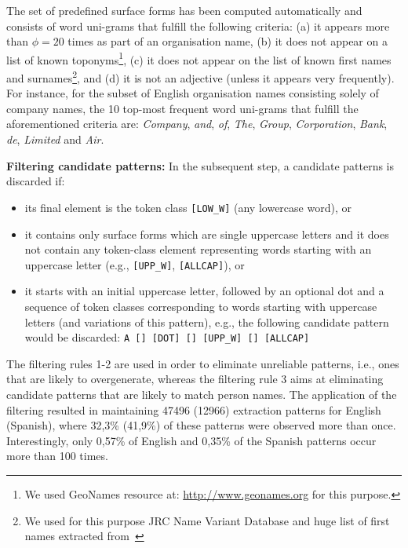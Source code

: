 \documentclass[output=paper]{langsci/langscibook}
\begin{document}
The set of predefined surface forms has been computed automatically and consists of word uni-grams that fulfill the following criteria: (a) it appears more than $\phi=20$ times as part of an organisation name, (b) it does not appear on a list of known toponyms\footnote{We used GeoNames resource at: \url{http://www.geonames.org} for this purpose.}, (c) it does not appear on the list of known first names and surnames\footnote{We used for this purpose {\sc JRC Name Variant Database} and huge list of first names extracted from~\cite{piskorski-11}}, and (d) it is not an adjective (unless it appears very frequently). For instance, for the subset of English organisation names consisting solely of company names, the 10 top-most frequent word uni-grams that fulfill the aforementioned criteria are: \textit{Company}, \textit{and}, \textit{of}, \textit{The}, \textit{Group}, \textit{Corporation}, \textit{Bank}, \textit{de}, \textit{Limited} and \textit{Air}.  

\vspace{0.3cm}
\noindent\textbf{Filtering candidate patterns:} In the subsequent
step, a candidate patterns is discarded if:
\begin{itemize}
\item[1] its final element is the token class \verb+[LOW_W]+ (any
  lowercase word), or
\item[2] it contains only surface forms which are single uppercase
  letters and it does not contain any token-class element representing
  words starting with an uppercase letter (e.g., \verb+[UPP_W]+,
  \verb+[ALLCAP]+), or
\item[3] it starts with an initial uppercase letter, followed by an
  optional dot and a sequence of token classes corresponding to words
  starting with uppercase letters (and variations of this pattern),
  e.g., the following candidate pattern would be discarded:
  \verb+A [] [DOT] [] [UPP_W] [] [ALLCAP]+
\end{itemize} 

\noindent The filtering rules 1-2 are used in order to eliminate
unreliable patterns, i.e., ones that are likely to overgenerate,
whereas the filtering rule 3 aims at eliminating candidate patterns
that are likely to match person names.  The application of the
filtering resulted in maintaining 47496 (12966) extraction patterns
for English (Spanish), where 32,3\% (41,9\%) of these patterns were
observed more than once. Interestingly, only 0,57\% of English and
0,35\% of the Spanish patterns occur more than 
100 times.
\end{document}
